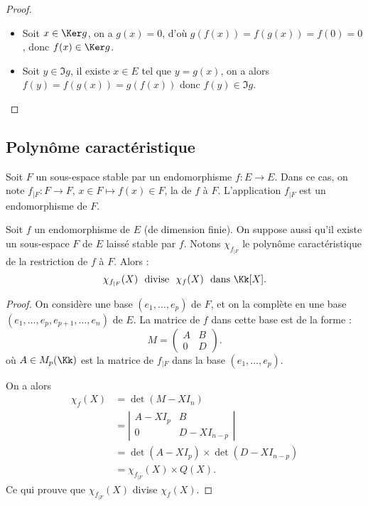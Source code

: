 \documentclass[12pt, class=report,crop=false]{standalone}
\begin{document}
\begin{proof}~
\begin{itemize}
  \item Soit $x\in\Ker g$, on  a $g(x)=0$, d'où $g(f(x))=f(g(x))=f(0)=0$, donc $f(x)\in\Ker g$.

  \item Soit $y\in\Im g$, il existe $x\in E$ tel que $y=g(x)$, on a alors 
$f(y)=f(g(x))=g(f(x))$ donc $f(y)\in \Im g$.
\end{itemize}
\end{proof} 



\subsection{Polynôme caractéristique}

Soit $F$ un sous-espace stable par un endomorphisme $f : E \to E$.
Dans ce cas, on note $f_{|F} : F \to F$, $x \in F \mapsto f(x) \in F$, la  de $f$ à $F$. L'application $f_{|F}$ est un endomorphisme de $F$.

\begin{lemme}
\label{lem:restr}
Soit $f$ un endomorphisme de $E$ (de dimension finie).
On suppose aussi qu'il existe un sous-espace $F$ de $E$ laissé stable par $f$. 
Notons $\chi_{f_{|F}}$ le polynôme caractéristique de la restriction de $f$ à $F$. 
Alors :
\[\chi_{f_{|F}}(X) \ \text{ divise } \  \chi_f(X) \ \text{ dans } \Kk[X].\]

\end{lemme}




\begin{proof}
On considère une base $(e_1,\dots,e_p)$ de $F$, 
et on la complète en une base $(e_1,\dots,e_p,e_{p+1},\dots,e_n)$ de $E$. 
La matrice de $f$ dans cette base est de la forme :
$$M = \left(\begin{array}{c|c}
A & B \\ \hline 
 0 & D\end{array}\right).$$
où $A \in M_p(\Kk)$ est la matrice de $f_{|F}$ dans la base $(e_1,\dots,e_p)$. 

On a alors
\begin{align*}
\chi_f(X) 
 &= \det(M-XI_n) \\
 &= \left|\begin{array}{c|c}
 A-XI_p & B \\ \hline 
 0 & D-XI_{n-p}\end{array}\right| \\
 &= \det(A-XI_p) \times \det(D-XI_{n-p}) \\
 &= \chi_{f_{|F}}(X) \times Q(X).
\end{align*}
Ce qui prouve que $\chi_{f_{|F}}(X)$ divise $\chi_f(X)$.
\end{proof}
\end{document}

